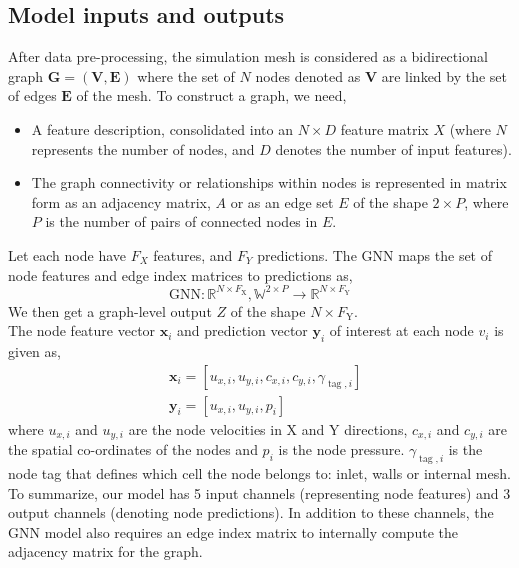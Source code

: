 \subsection{Model inputs and outputs}
After data pre-processing, the simulation mesh is considered as a bidirectional graph $\mathbf{G} = (\mathbf{V}, \mathbf{E})$ where the set of $N$ nodes denoted as $\mathbf{V}$ are linked by the set of edges $\mathbf{E}$ of the mesh. To construct a graph, we need,
\begin{itemize}
\item A feature description, consolidated into an $N \times D$ feature matrix $X$ (where $N$ represents the number of nodes, and $D$ denotes the number of input features).
\item The graph connectivity or relationships within nodes is represented in matrix form as an adjacency matrix, $A$ or as an edge set $E$ of the shape $2 \times P$, where $P$ is the number of pairs of connected nodes in $E$.
\end{itemize}
Let each node have $F_X$ features, and $F_Y$ predictions. The GNN maps the set of node features and edge index matrices to predictions as, 
\begin{equation}
    \mathrm{GNN}: \mathbb{R}^{{N} \times F_{\mathrm{X}}}, \mathbb{W}^{2 \times P} \rightarrow \mathbb{R}^{{N} \times F_{\mathrm{Y}}}
    \end{equation}
We then get a graph-level output $Z$ of the shape ${N} \times F_{\mathrm{Y}}$. \\
The node feature vector $\mathbf{x}_i$ and prediction vector $\mathbf{y}_i$ of interest at each node $v_i$ is given as,
\begin{equation}
    \begin{aligned}
    & \mathbf{x}_i=\left[u_{x, i}, u_{y, i},c_{x, i}, c_{y, i}, \gamma_{\operatorname{tag}, i}\right] \\
    & \mathbf{y}_i=\left[u_{x, i}, u_{y, i}, p_i\right]
    \end{aligned}
\end{equation}
where $u_{x, i}$ and $u_{y, i}$ are the node velocities in X and Y directions, $c_{x, i}$ and $c_{y, i}$ are the spatial co-ordinates of the nodes and $p_i$ is the node pressure. $\gamma_{\operatorname{tag}, i}$ is the node tag that defines which cell the node belongs to: inlet, walls or internal mesh. To summarize, our model has 5 input channels (representing node features) and 3 output channels (denoting node predictions). In addition to these channels, the GNN model also requires an edge index matrix to internally compute the adjacency matrix for the graph. 
